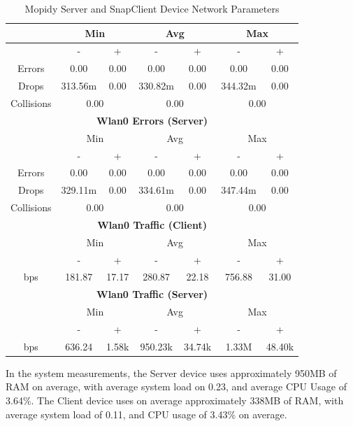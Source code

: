 \documentclass[11pt,a4paper,headinclude=false,footinclude=false]{scrreprt}
\begin{document}
\begin{table}[H]
\begin{tabular}{||c|c|c|c|c|c|c||}
    \hline\hline
      & \multicolumn{2}{|c|}{Min} & \multicolumn{2}{|c|}{Avg} & \multicolumn{2}{|c|}{Max} \\
    \hline
      & - & + & - & + & - & + \\
    \hline
    Errors  & 0.00 & 0.00 & 0.00 & 0.00 & 0.00 & 0.00 \\
    \hline
    Drops & 313.56m & 0.00 & 330.82m & 0.00 & 344.32m & 0.00 \\
    \hline
    Collisions & \multicolumn{2}{|c|}{0.00} & \multicolumn{2}{|c|}{0.00} & \multicolumn{2}{|c|}{0.00} \\
    \hline\hline
    \multicolumn{7}{|c|}{\textbf{Wlan0 Errors (Server)}} \\
    \hline\hline
      & \multicolumn{2}{|c|}{Min} & \multicolumn{2}{|c|}{Avg} & \multicolumn{2}{|c|}{Max} \\
    \hline
      & - & + & - & + & - & + \\
    \hline
    Errors  & 0.00 & 0.00 & 0.00 & 0.00 & 0.00 & 0.00 \\
    \hline
    Drops & 329.11m & 0.00 & 334.61m & 0.00 & 347.44m & 0.00 \\
    \hline
    Collisions & \multicolumn{2}{|c|}{0.00} & \multicolumn{2}{|c|}{0.00} & \multicolumn{2}{|c|}{0.00} \\
    \hline\hline
    \multicolumn{7}{|c|}{\textbf{Wlan0 Traffic (Client)}} \\
    \hline\hline
      & \multicolumn{2}{|c|}{Min} & \multicolumn{2}{|c|}{Avg} & \multicolumn{2}{|c|}{Max} \\
    \hline
      & - & + & - & + & - & + \\
    \hline
    bps  & 181.87 & 17.17 & 280.87 & 22.18 & 756.88 & 31.00 \\
    \hline\hline
    \multicolumn{7}{|c|}{\textbf{Wlan0 Traffic (Server)}} \\
    \hline\hline
      & \multicolumn{2}{|c|}{Min} & \multicolumn{2}{|c|}{Avg} & \multicolumn{2}{|c|}{Max} \\
    \hline
      & - & + & - & + & - & + \\
    \hline
    bps  & 636.24 & 1.58k & 950.23k & 34.74k & 1.33M & 48.40k \\
    \hline\hline
    \end{tabular}
    \caption{Mopidy Server and SnapClient Device Network Parameters}
    \label{MopidyclientserverNetTab}
\end{table}

In the system measurements, the Server device uses approximately 950MB
of RAM on average, with average system load on 0.23, and average CPU
Usage of 3.64\%. The Client device uses on average approximately 338MB
of RAM, with average system load of 0.11, and CPU usage of 3.43\% on
average.
\end{document}
